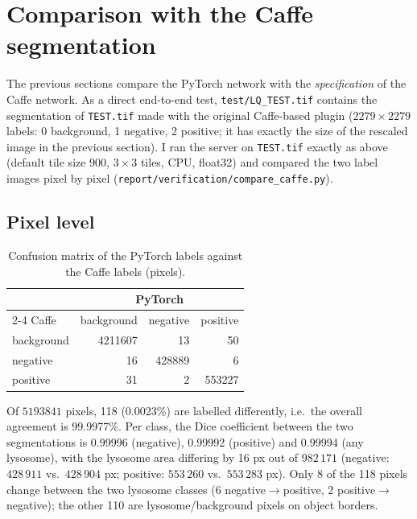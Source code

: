 \documentclass[11pt,a4paper]{article}
\begin{document}
\section{Comparison with the Caffe segmentation}\label{sec:caffe}
The previous sections compare the PyTorch network with the \emph{specification} of the Caffe network. As a direct end-to-end test, \texttt{test/LQ\_TEST.tif} contains the segmentation of \texttt{TEST.tif} made with the original Caffe-based plugin ($2279{\times}2279$ labels: 0 background, 1 negative, 2 positive; it has exactly the size of the rescaled image in the previous section). I ran the server on \texttt{TEST.tif} exactly as above (default tile size 900, $3{\times}3$ tiles, CPU, float32) and compared the two label images pixel by pixel (\texttt{report/verification/compare\_caffe.py}).

\subsection{Pixel level}
\begin{table}[h]\centering
\caption{Confusion matrix of the PyTorch labels against the Caffe labels (pixels).}\label{tab:conf}
\begin{tabular}{l rrr}\toprule
 & \multicolumn{3}{c}{PyTorch}\\\cmidrule(l){2-4}
Caffe & background & negative & positive\\\midrule
background & \num[scientific-notation=false,round-mode=none]{4211607} & 13 & 50\\
negative & 16 & \num[scientific-notation=false,round-mode=none]{428889} & 6\\
positive & 31 & 2 & \num[scientific-notation=false,round-mode=none]{553227}\\\bottomrule
\end{tabular}
\end{table}

Of $\num[scientific-notation=false,round-mode=none]{5193841}$ pixels, 118 (0.0023\%) are labelled differently, i.e.\ the overall agreement is 99.9977\%. Per class, the Dice coefficient between the two segmentations is 0.99996 (negative), 0.99992 (positive) and 0.99994 (any lysosome), with the lysosome area differing by 16 px out of $982\,171$ (negative: $428\,911$ vs.\ $428\,904$ px; positive: $553\,260$ vs.\ $553\,283$ px). Only 8 of the 118 pixels change between the two lysosome classes (6 negative$\to$positive, 2 positive$\to$negative); the other 110 are lysosome/background pixels on object borders.
\end{document}
